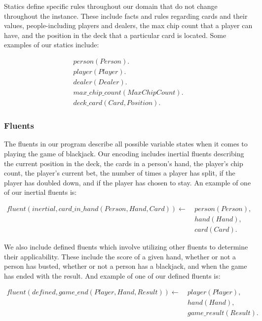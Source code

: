 \documentclass{article}
\begin{document}
Statics define specific rules throughout our domain that do not change throughout the instance.
These include facts and rules regarding cards and their values, people-including players and dealers, the max chip count
that a player can have, and the position in the deck that a particular card is located.
Some examples of our statics include:

\begin{gather}
    person(Person). \\
    player(Player). \\
    dealer(Dealer). \\
    max\_chip\_count(MaxChipCount). \\
    deck\_card(Card, Position).
\end{gather}

\subsubsection{Fluents}

The fluents in our program describe all possible variable states when it comes to playing the game of blackjack.
Our encoding includes inertial fluents describing the current position in the deck,
the cards in a person's hand, the player's chip count, the player's current bet,
the number of times a player has split, if the player has doubled down, and
if the player has chosen to stay. An example of one of our inertial fluents is:

\begin{equation}
    \begin{split}
        fluent(inertial, card\_in\_hand(Person, Hand, Card)) \leftarrow \
            & person(Person), \\
            & hand(Hand), \\
            & card(Card).
    \end{split}
\end{equation}

We also include defined fluents which involve utilizing other fluents to determine their applicability.
These include the score of a given hand, whether or not a person has busted,
whether or not a person has a blackjack, and when the game has ended with the result.
And example of one of our defined fluents is:

\begin{equation}
    \begin{split}
        fluent(defined, game\_end(Player, Hand, Result)) \leftarrow \
            & player(Player), \\
            & hand(Hand), \\
            & game\_result(Result).
    \end{split}
\end{equation}
\end{document}
